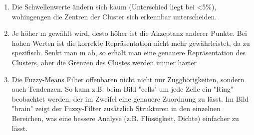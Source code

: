 \begin{enumerate}
	\item Die Schwellenwerte ändern sich kaum (Unterschied liegt bei <5\%), wohingengen die Zentren der Cluster sich erkennbar unterscheiden. 

	\item Je höher m gewählt wird, desto höher ist die Akzeptanz anderer Punkte. Bei hohen Werten ist die korrekte Repräsentation nicht mehr gewährleistet, da zu spezifisch. Senkt man m ab, so erhält man eine genauere Repräsentation des Clusters, aber die Grenzen des Clustes werden immer härter

	\item Die Fuzzy-Means Filter offenbaren nicht nicht nur Zugghörigkeiten, sondern auch Tendenzen. So kann z.B. beim Bild "cells" um jede Zelle ein "Ring" beobachtet werden, der im Zweifel eine genauere Zuordnung zu lässt. Im Bild "brain" zeigt der Fuzzy-Filter zusätzlich Strukturen in den einzelnen Bereichen, was eine bessere Analyse (z.B. Flüssigkeit, Dichte) einfacher zu lässt.

\end{enumerate}
